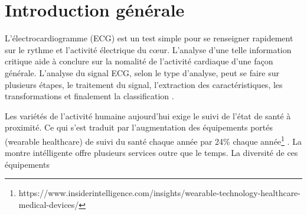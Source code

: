 \chapter*{Introduction générale}
L'électrocardiogramme (ECG) est un test simple pour se renseigner rapidement sur le rythme et l'activité électrique du c\oe ur. L'analyse d'une telle information critique aide à conclure sur la nomalité de l'activité cardiaque d'une façon générale. L'analyse du signal ECG, selon le type d'analyse, peut se faire sur plusieurs étapes, le traitement du signal, l'extraction des caractéristiques, les transformations et finalement la classification \cite{1, 2}.

Les variétés de l'activité humaine aujourd'hui exige le suivi de l'état de santé à proximité. Ce qui s'est traduit par l'augmentation des équipements portés (wearable healthcare) de suivi du santé chaque année par 24\% chaque année\footnote{https://www.insiderintelligence.com/insights/wearable-technology-healthcare-medical-devices/} \cite{3}. La montre intélligente offre plusieurs services outre que le temps. La diversité de ces équipements 